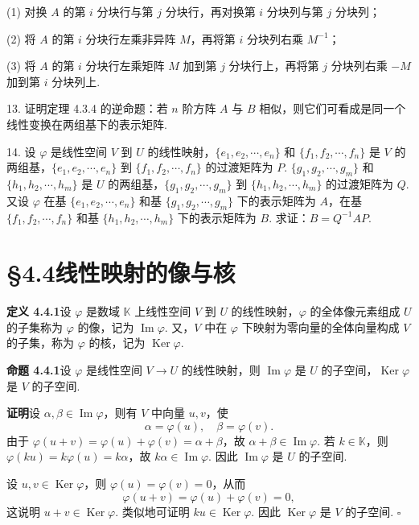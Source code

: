 \documentclass[UTF8, 12pt, fontset=fandol, oneside]{ctexart}
\begin{document}
(1) 对换 $A$ 的第 $i$ 分块行与第 $j$ 分块行，再对换第 $i$ 分块列与第 $j$ 分块列；

(2) 将 $A$ 的第 $i$ 分块行左乘非异阵 $M$，再将第 $i$ 分块列右乘 $M^{-1}$；

(3) 将 $A$ 的第 $i$ 分块行左乘矩阵 $M$ 加到第 $j$ 分块行上，再将第 $j$ 分块列右乘 $-M$ 加到第 $i$ 分块列上.

13. 证明定理 4.3.4 的逆命题：若 $n$ 阶方阵 $A$ 与 $B$ 相似，则它们可看成是同一个线性变换在两组基下的表示矩阵.

14. 设 $\varphi$ 是线性空间 $V$ 到 $U$ 的线性映射，$\{e_1,e_2,\cdots,e_n\}$ 和 $\{f_1,f_2,\cdots,f_n\}$ 是 $V$ 的两组基，$\{e_1,e_2,\cdots,e_n\}$ 到 $\{f_1,f_2,\cdots,f_n\}$ 的过渡矩阵为 $P$. $\{g_1,g_2,\cdots,g_m\}$ 和 $\{h_1,h_2,\cdots,h_m\}$ 是 $U$ 的两组基，$\{g_1,g_2,\cdots,g_m\}$ 到 $\{h_1,h_2,\cdots,h_m\}$ 的过渡矩阵为 $Q$. 又设 $\varphi$ 在基 $\{e_1,e_2,\cdots,e_n\}$ 和基 $\{g_1,g_2,\cdots,g_m\}$ 下的表示矩阵为 $A$，在基 $\{f_1,f_2,\cdots,f_n\}$ 和基 $\{h_1,h_2,\cdots,h_m\}$ 下的表示矩阵为 $B$. 求证：$B=Q^{-1}AP$.

\section*{§4.4\quad 线性映射的像与核}

\noindent\textbf{定义 4.4.1}\quad 设 $\varphi$ 是数域 $\mathbb{K}$ 上线性空间 $V$ 到 $U$ 的线性映射，$\varphi$ 的全体像元素组成 $U$ 的子集称为 $\varphi$ 的像，记为 $\operatorname{Im}\varphi$. 又，$V$ 中在 $\varphi$ 下映射为零向量的全体向量构成 $V$ 的子集，称为 $\varphi$ 的核，记为 $\operatorname{Ker}\varphi$.

\noindent\textbf{命题 4.4.1}\quad 设 $\varphi$ 是线性空间 $V\to U$ 的线性映射，则 $\operatorname{Im}\varphi$ 是 $U$ 的子空间，$\operatorname{Ker}\varphi$ 是 $V$ 的子空间.

\noindent\textbf{证明}\quad 设 $\alpha,\beta\in\operatorname{Im}\varphi$，则有 $V$ 中向量 $u,v$，使
\[
\alpha=\varphi(u),\quad \beta=\varphi(v).
\]
由于 $\varphi(u+v)=\varphi(u)+\varphi(v)=\alpha+\beta$，故 $\alpha+\beta\in\operatorname{Im}\varphi$. 若 $k\in\mathbb{K}$，则 $\varphi(ku)=k\varphi(u)=k\alpha$，故 $k\alpha\in\operatorname{Im}\varphi$. 因此 $\operatorname{Im}\varphi$ 是 $U$ 的子空间.

设 $u,v\in\operatorname{Ker}\varphi$，则 $\varphi(u)=\varphi(v)=0$，从而
\[
\varphi(u+v)=\varphi(u)+\varphi(v)=0,
\]
这说明 $u+v\in\operatorname{Ker}\varphi$. 类似地可证明 $ku\in\operatorname{Ker}\varphi$. 因此 $\operatorname{Ker}\varphi$ 是 $V$ 的子空间. $\square$
\end{document}
